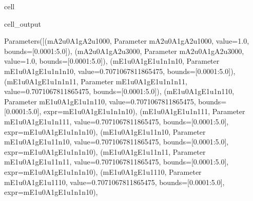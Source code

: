 \documentclass[letterpaper,table,10pt,english]{jupyterBook}
\begin{document}
\begin{sphinxuseclass}{cell}
\begin{sphinxVerbatimOutput}
\begin{sphinxuseclass}{cell_output}
\begin{sphinxVerbatim}[commandchars=\\\{\}]
Parameters([(\PYGZsq{}m\PYGZus{}A2u\PYGZus{}0\PYGZus{}A1g\PYGZus{}A2u\PYGZus{}1\PYGZus{}0\PYGZus{}0\PYGZus{}0\PYGZsq{}, \PYGZlt{}Parameter \PYGZsq{}m\PYGZus{}A2u\PYGZus{}0\PYGZus{}A1g\PYGZus{}A2u\PYGZus{}1\PYGZus{}0\PYGZus{}0\PYGZus{}0\PYGZsq{}, value=1.0, bounds=[0.0001:5.0]\PYGZgt{}), (\PYGZsq{}m\PYGZus{}A2u\PYGZus{}0\PYGZus{}A1g\PYGZus{}A2u\PYGZus{}3\PYGZus{}0\PYGZus{}0\PYGZus{}0\PYGZsq{}, \PYGZlt{}Parameter \PYGZsq{}m\PYGZus{}A2u\PYGZus{}0\PYGZus{}A1g\PYGZus{}A2u\PYGZus{}3\PYGZus{}0\PYGZus{}0\PYGZus{}0\PYGZsq{}, value=1.0, bounds=[0.0001:5.0]\PYGZgt{}), (\PYGZsq{}m\PYGZus{}E1u\PYGZus{}0\PYGZus{}A1g\PYGZus{}E1u\PYGZus{}1\PYGZus{}n1\PYGZus{}n1\PYGZus{}0\PYGZsq{}, \PYGZlt{}Parameter \PYGZsq{}m\PYGZus{}E1u\PYGZus{}0\PYGZus{}A1g\PYGZus{}E1u\PYGZus{}1\PYGZus{}n1\PYGZus{}n1\PYGZus{}0\PYGZsq{}, value=0.7071067811865475, bounds=[0.0001:5.0]\PYGZgt{}), (\PYGZsq{}m\PYGZus{}E1u\PYGZus{}0\PYGZus{}A1g\PYGZus{}E1u\PYGZus{}1\PYGZus{}n1\PYGZus{}n1\PYGZus{}1\PYGZsq{}, \PYGZlt{}Parameter \PYGZsq{}m\PYGZus{}E1u\PYGZus{}0\PYGZus{}A1g\PYGZus{}E1u\PYGZus{}1\PYGZus{}n1\PYGZus{}n1\PYGZus{}1\PYGZsq{}, value=0.7071067811865475, bounds=[0.0001:5.0]\PYGZgt{}), (\PYGZsq{}m\PYGZus{}E1u\PYGZus{}0\PYGZus{}A1g\PYGZus{}E1u\PYGZus{}1\PYGZus{}n1\PYGZus{}1\PYGZus{}0\PYGZsq{}, \PYGZlt{}Parameter \PYGZsq{}m\PYGZus{}E1u\PYGZus{}0\PYGZus{}A1g\PYGZus{}E1u\PYGZus{}1\PYGZus{}n1\PYGZus{}1\PYGZus{}0\PYGZsq{}, value=0.7071067811865475, bounds=[0.0001:5.0], expr=\PYGZsq{}m\PYGZus{}E1u\PYGZus{}0\PYGZus{}A1g\PYGZus{}E1u\PYGZus{}1\PYGZus{}n1\PYGZus{}n1\PYGZus{}0\PYGZsq{}\PYGZgt{}), (\PYGZsq{}m\PYGZus{}E1u\PYGZus{}0\PYGZus{}A1g\PYGZus{}E1u\PYGZus{}1\PYGZus{}n1\PYGZus{}1\PYGZus{}1\PYGZsq{}, \PYGZlt{}Parameter \PYGZsq{}m\PYGZus{}E1u\PYGZus{}0\PYGZus{}A1g\PYGZus{}E1u\PYGZus{}1\PYGZus{}n1\PYGZus{}1\PYGZus{}1\PYGZsq{}, value=0.7071067811865475, bounds=[0.0001:5.0], expr=\PYGZsq{}m\PYGZus{}E1u\PYGZus{}0\PYGZus{}A1g\PYGZus{}E1u\PYGZus{}1\PYGZus{}n1\PYGZus{}n1\PYGZus{}0\PYGZsq{}\PYGZgt{}), (\PYGZsq{}m\PYGZus{}E1u\PYGZus{}0\PYGZus{}A1g\PYGZus{}E1u\PYGZus{}1\PYGZus{}1\PYGZus{}n1\PYGZus{}0\PYGZsq{}, \PYGZlt{}Parameter \PYGZsq{}m\PYGZus{}E1u\PYGZus{}0\PYGZus{}A1g\PYGZus{}E1u\PYGZus{}1\PYGZus{}1\PYGZus{}n1\PYGZus{}0\PYGZsq{}, value=0.7071067811865475, bounds=[0.0001:5.0], expr=\PYGZsq{}m\PYGZus{}E1u\PYGZus{}0\PYGZus{}A1g\PYGZus{}E1u\PYGZus{}1\PYGZus{}n1\PYGZus{}n1\PYGZus{}0\PYGZsq{}\PYGZgt{}), (\PYGZsq{}m\PYGZus{}E1u\PYGZus{}0\PYGZus{}A1g\PYGZus{}E1u\PYGZus{}1\PYGZus{}1\PYGZus{}n1\PYGZus{}1\PYGZsq{}, \PYGZlt{}Parameter \PYGZsq{}m\PYGZus{}E1u\PYGZus{}0\PYGZus{}A1g\PYGZus{}E1u\PYGZus{}1\PYGZus{}1\PYGZus{}n1\PYGZus{}1\PYGZsq{}, value=0.7071067811865475, bounds=[0.0001:5.0], expr=\PYGZsq{}m\PYGZus{}E1u\PYGZus{}0\PYGZus{}A1g\PYGZus{}E1u\PYGZus{}1\PYGZus{}n1\PYGZus{}n1\PYGZus{}0\PYGZsq{}\PYGZgt{}), (\PYGZsq{}m\PYGZus{}E1u\PYGZus{}0\PYGZus{}A1g\PYGZus{}E1u\PYGZus{}1\PYGZus{}1\PYGZus{}1\PYGZus{}0\PYGZsq{}, \PYGZlt{}Parameter \PYGZsq{}m\PYGZus{}E1u\PYGZus{}0\PYGZus{}A1g\PYGZus{}E1u\PYGZus{}1\PYGZus{}1\PYGZus{}1\PYGZus{}0\PYGZsq{}, value=0.7071067811865475, bounds=[0.0001:5.0], expr=\PYGZsq{}m\PYGZus{}E1u\PYGZus{}0\PYGZus{}A1g\PYGZus{}E1u\PYGZus{}1\PYGZus{}n1\PYGZus{}n1\PYGZus{}0\PYGZsq{}\PYGZgt{}), 
\end{sphinxVerbatim}
\end{sphinxuseclass}
\end{sphinxVerbatimOutput}
\end{sphinxuseclass}
\end{document}
